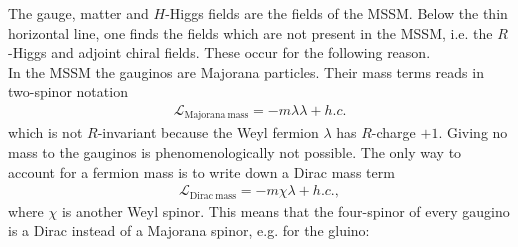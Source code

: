 The gauge, matter and $H$-Higgs fields are the fields of the MSSM. Below the thin horizontal line, one finds the fields which are not present in the MSSM, i.e. the $R$-Higgs and adjoint chiral fields. These occur for the following reason.\\
In the MSSM the gauginos are Majorana particles. Their mass terms  reads in two-spinor notation
\begin{align}
\mathcal{L}_{\mathrm{Majorana\ mass}} = -m\lambda\lambda + h.c.
\end{align}
which is not $R$-invariant because the Weyl fermion $\lambda$ has $R$-charge $+1$. Giving no mass to the gauginos is phenomenologically not possible. The only way to account for a fermion mass is to write down a Dirac mass term
\begin{align}
\mathcal{L}_{\mathrm{Dirac\ mass}} = -m \chi\lambda + h.c.,
\end{align}
where $\chi$ is another Weyl spinor. This means that the four-spinor of every gaugino is a Dirac  instead of a Majorana spinor, e.g. for the gluino:
